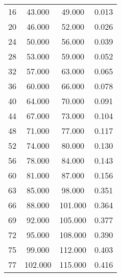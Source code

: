 % 
\begin{tabular}{cccc}
  \hline
  \hline
16 & 43.000 & 49.000 & 0.013 \\ 
  20 & 46.000 & 52.000 & 0.026 \\ 
  24 & 50.000 & 56.000 & 0.039 \\ 
  28 & 53.000 & 59.000 & 0.052 \\ 
  32 & 57.000 & 63.000 & 0.065 \\ 
  36 & 60.000 & 66.000 & 0.078 \\ 
  40 & 64.000 & 70.000 & 0.091 \\ 
  44 & 67.000 & 73.000 & 0.104 \\ 
  48 & 71.000 & 77.000 & 0.117 \\ 
  52 & 74.000 & 80.000 & 0.130 \\ 
  56 & 78.000 & 84.000 & 0.143 \\ 
  60 & 81.000 & 87.000 & 0.156 \\ 
  63 & 85.000 & 98.000 & 0.351 \\ 
  66 & 88.000 & 101.000 & 0.364 \\ 
  69 & 92.000 & 105.000 & 0.377 \\ 
  72 & 95.000 & 108.000 & 0.390 \\ 
  75 & 99.000 & 112.000 & 0.403 \\ 
  77 & 102.000 & 115.000 & 0.416 \\ 
   \hline
\end{tabular}
